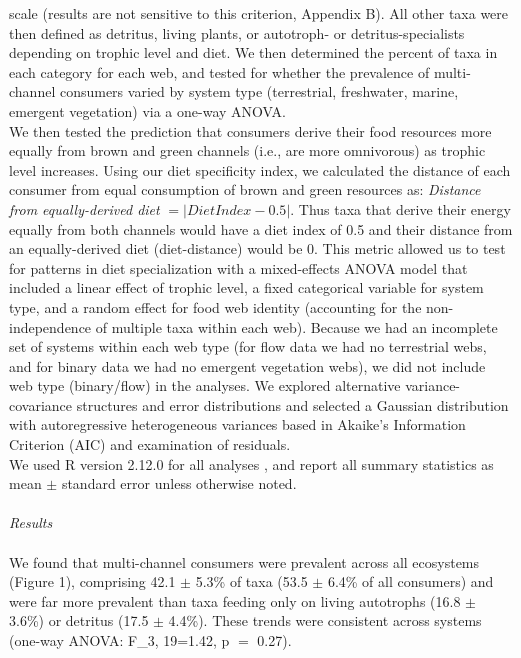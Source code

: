 \documentclass[12pt,a4paper,oneside]{article}
\begin{document}
scale (results are not sensitive to this criterion, Appendix B). All
other taxa were then defined as detritus, living plants, or 
autotroph- or detritus-specialists depending on trophic level and
diet. We then determined the percent of taxa in each category for each
web, and tested for whether the prevalence of multi-channel consumers
varied by system type (terrestrial, freshwater, marine, emergent
vegetation) via a one-way ANOVA.
\\
\indent We then tested the prediction that consumers derive their food resources more
equally from brown and green channels
(i.e., are more omnivorous) as trophic level
increases. Using our diet specificity index, we
calculated the distance of 
each consumer from equal consumption of brown and green resources as:
\emph{Distance from equally-derived diet} \(= |Diet Index-0.5|\). Thus taxa
that derive their energy equally from both channels would have
a diet index of 0.5 and their distance from an equally-derived diet
(diet-distance) would be 0. This metric allowed us to test for
patterns in diet specialization
with a mixed-effects ANOVA model that included a linear effect of
trophic level, a fixed categorical variable for system type, 
and a random effect for food web identity (accounting for the non-independence of multiple taxa within each web). Because we had an
incomplete set of systems within each
web type (for flow data we had no terrestrial webs, and for binary data
we had no emergent vegetation webs), we did not include web type
(binary/flow) in the analyses. We explored alternative
variance-covariance structures and error distributions
\citep{Bolker:2009, Wolfinger:1996} 
and selected a Gaussian distribution with
autoregressive heterogeneous variances based in
Akaike's Information Criterion (AIC) and examination
of residuals. 
\\ 
\indent We used R version 2.12.0 for all
analyses \citep{Rcore:2010}, and report all summary statistics as mean ${\pm}$
standard error unless otherwise noted.
\\
\\
\emph{Results}\\
\\
\indent We found that multi-channel consumers were prevalent across all ecosystems
(Figure 1), comprising 42.1 ${\pm}$ 5.3\% of taxa (53.5 ${\pm}$ 6.4\%
of all consumers) and were far more
prevalent than taxa feeding only on living
autotrophs (16.8 ${\pm}$ 3.6\%) or detritus (17.5 ${\pm}$ 4.4\%). These
trends were consistent across systems (one-way ANOVA:
F_{3, 19}=1.42, p \(=\) 0.27).
\end{document}
